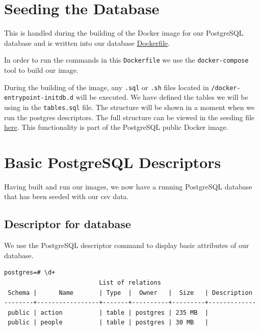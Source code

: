 \documentclass[]{report}
\newenvironment{Shaded}{}{}
\newcommand{\KeywordTok}[1]{\textcolor[rgb]{0.00,0.44,0.13}{\textbf{{#1}}}}
\newcommand{\NormalTok}[1]{{#1}}
\begin{document}
\hypertarget{seeding-the-database}{\chapter{Seeding the
Database}\label{seeding-the-database}}

This is handled during the building of the Docker image for our
PostgreSQL database and is written into our database
\href{https://github.com/joshuacook/redhat/blob/master/docker/postgres/Dockerfile}{Dockerfile}.

In order to run the commands in this \texttt{Dockerfile} we use the
\texttt{docker-compose} tool to build our image.

\begin{Shaded}
\end{Shaded}

During the building of the image, any \texttt{.sql} or \texttt{.sh}
files located in \texttt{/docker-entrypoint-initdb.d} will be executed.
We have defined the tables we will be using in the \texttt{tables.sql}
file. The structure will be shown in a moment when we run the postgres
descriptors. The full structure can be viewed in the seeding file
\href{https://github.com/joshuacook/redhat/blob/master/docker/postgres/tables.sql}{here}.
This functionality is part of the PostgreSQL public Docker image.

\pagebreak

\chapter{Basic PostgreSQL
Descriptors}\label{basic-postgresql-descriptors}

Having built and run our images, we now have a running PostgreSQL
database that has been seeded with our csv data.

\section{Descriptor for database}\label{descriptor-for-database}

We use the PostgreSQL descriptor command to display basic attributes of
our database.

\begin{verbatim}
postgres=# \d+
                          List of relations
 Schema |      Name       | Type  |  Owner   |  Size   | Description
--------+-----------------+-------+----------+---------+-------------
 public | action          | table | postgres | 235 MB  |
 public | people          | table | postgres | 30 MB   |
\end{verbatim}
\end{document}
